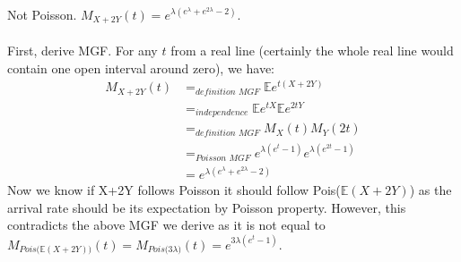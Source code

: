
\setcounter{theorem}{18}
\begin{exercise} [BH.6.19] 
\begin{solution}
    Not Poisson. $M_{X+2Y}(t)= e^{\lambda(e^\lambda+e^{2\lambda} -2) }$.\\~\\
    First, derive MGF. For any $t$ from a real line (certainly the whole real line would contain one open interval around zero), we have:
    \begin{align*}
    	M_{X+2Y}(t) &=_{\textit{definition MGF}} \mathbb{E} e^{t(X+2Y)} \\&=_{\textit{independence}} \mathbb{E} e^{tX}\mathbb{E} e^{2tY} \\&=_{\textit{definition MGF}} M_{X}(t)M_{Y}(2t) \\&=_{\textit{Poisson MGF}}  e^{\lambda(e^t-1)}e^{\lambda(e^{2t}-1)} \\
    	&= e^{\lambda(e^\lambda+e^{2\lambda} -2) }
    \end{align*}
    Now we know if X+2Y follows Poisson it should follow Pois($\mathbb{E}(X+2Y)$) as the arrival rate should be its expectation by Poisson property. However, this contradicts the above MGF we derive as it is not equal to $M_{\textit{Pois($\mathbb{E}(X+2Y)$)}}(t)=M_{\textit{Pois($3\lambda$)}}(t)= e^{3\lambda(e^t-1)}$.
\end{solution}
\end{exercise}

